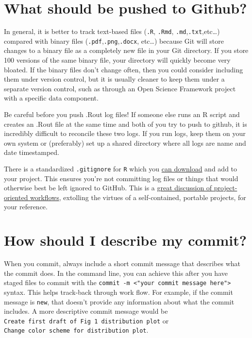 \documentclass[
]{book}
\begin{document}
\hypertarget{what-should-be-pushed-to-github}{%
\section{What should be pushed to Github?}\label{what-should-be-pushed-to-github}}

In general, it is better to track text-based files (\texttt{.R}, \texttt{.Rmd}, \texttt{.md},\texttt{.txt},etc\ldots) compared with binary files (\texttt{.pdf},\texttt{.png},\texttt{.docx}, etc\ldots) because Git will store changes to a binary file as a completely new file in your Git directory. If you store 100 versions of the same binary file, your directory will quickly become very bloated. If the binary files don't change often, then you could consider including them under version control, but it is usually cleaner to keep them under a separate version control, such as through an Open Science Framework project with a specific data component.

Be careful before you push .Rout log files! If someone else runs an R script and creates an .Rout file at the same time and both of you try to push to github, it is incredibly difficult to reconcile these two logs. If you run logs, keep them on your own system or (preferably) set up a shared directory where all logs are name and date timestamped.

There is a standardized \texttt{.gitignore} for \texttt{R} which you \href{https://github.com/github/gitignore/blob/master/R.gitignore}{can download} and add to your project. This ensures you're not committing log files or things that would otherwise best be left ignored to GitHub. This is a \href{https://www.tidyverse.org/articles/2017/12/workflow-vs-script/}{great discussion of project-oriented workflows}, extolling the virtues of a self-contained, portable projects, for your reference.

\hypertarget{how-should-i-describe-my-commit}{%
\section{How should I describe my commit?}\label{how-should-i-describe-my-commit}}

When you commit, always include a short commit message that describes what the commit does. In the command line, you can achieve this after you have staged files to commit with the \texttt{commit\ -m\ \textless{}"your\ commit\ message\ here"\textgreater{}} syntax. This helps track-back through work flow. For example, if the commit message is \texttt{new}, that doesn't provide any information about what the commit includes. A more descriptive commit message would be \texttt{Create\ first\ draft\ of\ Fig\ 1\ distribution\ plot} or \texttt{Change\ color\ scheme\ for\ distribution\ plot}.
\end{document}
